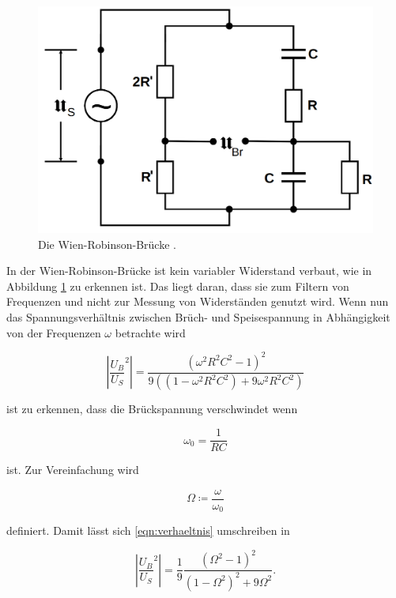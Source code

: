 \begin{figure}
    \centering
    \includegraphics[scale=0.25]{content/Wien-Robinson-Bruecke.png}
    \caption{Die Wien-Robinson-Brücke \cite[S. 223]{anleitung}.}
    \label{fig:wien}
\end{figure}

In der Wien-Robinson-Brücke ist kein variabler Widerstand verbaut, wie in Abbildung \ref{fig:wien}
zu erkennen ist.
Das liegt daran, dass sie zum Filtern von Frequenzen und nicht zur Messung von Widerständen genutzt wird.
Wenn nun das Spannungsverhältnis zwischen Brüch- und Speisespannung in Abhängigkeit von der Frequenzen $\omega$ betrachte wird 

\begin{equation}
    \left | \frac{U_B}{U_S}^2 \right | = \frac{(\omega^2R^2C^2-1)^2}{9((1-\omega^2R^2C^2) + 9 \omega^2 R^2 C^2)}
    \label{eqn:verhaeltnis}
\end{equation}

ist zu erkennen, dass die Brückspannung verschwindet wenn 

\begin{equation}
    \omega_0 = \frac{1}{RC}
\end{equation}

ist. Zur Vereinfachung wird 

\begin{equation*}
    \Omega \coloneq \frac{\omega}{\omega_0}
\end{equation*}

definiert. Damit lässt sich \eqref{eqn:verhaeltnis} umschreiben in

\begin{equation}
    \left | \frac{U_B}{U_S}^2 \right | = \frac{1}{9} \frac{(\Omega^2 -1)^2}{(1-\Omega^2)^2 + 9\Omega^2}.
\end{equation}

